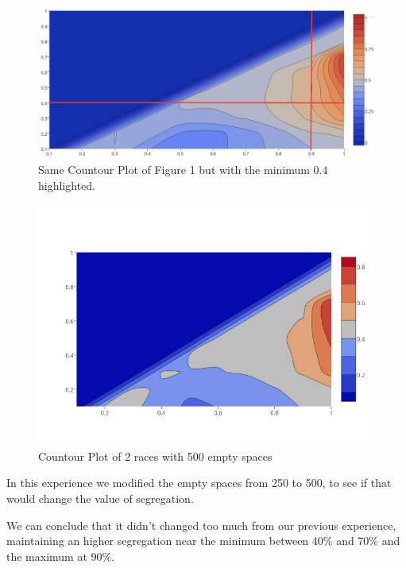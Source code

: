 \documentclass[a4paper,titlepage,11pt]{article}
\begin{document}
\begin{figure}[h!]
    \centering
    \includegraphics[scale=0.40]{img/ploty-a.png}
    \caption{Same Countour Plot of Figure 1 but with the minimum $0.4$ highlighted.}
\end{figure}

\newpage

\begin{figure}[h!]
    \centering
    \includegraphics[scale=0.50]{img/500emptyspaces.png}
    \caption{Countour Plot of 2 races with 500 empty spaces}
\end{figure}

In this experience we modified the empty spaces from 250 to 500, to see if that would change the value of segregation. 

We can conclude that it didn't changed too much from our previous experience, maintaining an higher segregation near the minimum between 40\% and 70\% and the maximum at 90\%.

\newpage
\end{document}
